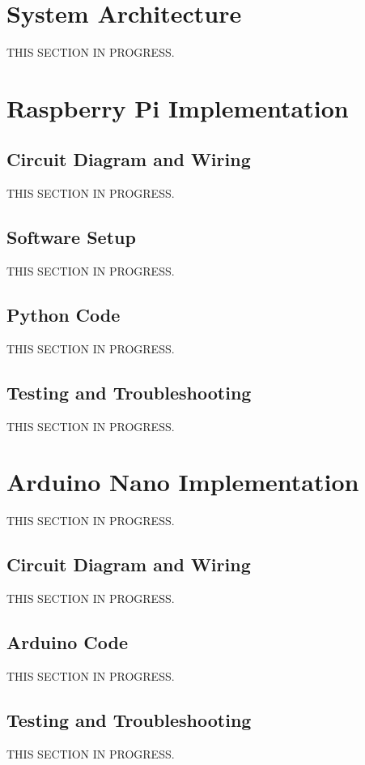 \documentclass{article}
\begin{document}
\begin{multicols}{2}
		\section{System Architecture}
		THIS SECTION IN PROGRESS.
		
		\section{Raspberry Pi Implementation}
		
			\subsection{Circuit Diagram and Wiring}
			THIS SECTION IN PROGRESS.
			
			\subsection{Software Setup}
			THIS SECTION IN PROGRESS.
			
			\subsection{Python Code}
			THIS SECTION IN PROGRESS.
			
			\subsection{Testing and Troubleshooting}
			THIS SECTION IN PROGRESS.
		
		\section{Arduino Nano Implementation}
		THIS SECTION IN PROGRESS.
		
			\subsection{Circuit Diagram and Wiring}
			THIS SECTION IN PROGRESS.
			
			\subsection{Arduino Code}
			THIS SECTION IN PROGRESS.
			
			\subsection{Testing and Troubleshooting}
			THIS SECTION IN PROGRESS.
		

\end{multicols}
\end{document}
